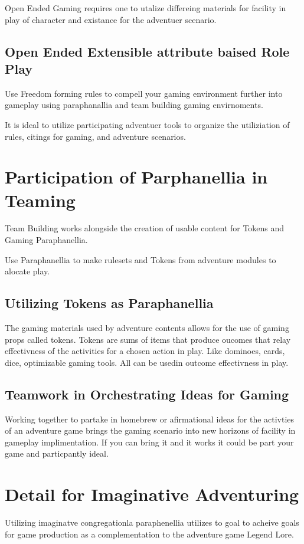 \documentclass{article}
\begin{document}
Open Ended Gaming requires one to utalize differeing materials for facility in play of character and existance for the adventuer scenario.

\subsection{Open Ended Extensible attribute baised Role Play}

Use Freedom forming rules to compell your gaming environment further into gameplay using paraphanallia and team building gaming envirnoments.

It is ideal to utilize participating adventuer tools to organize the utiliziation of rules, citings for gaming, and adventure scenarios.

\section{Participation of Parphanellia in Teaming}

Team Building works alongside the creation of usable content for Tokens and Gaming Paraphanellia.

Use Paraphanellia to make rulesets and Tokens from adventure modules to alocate play.

\subsection{Utilizing Tokens as Paraphanellia}

The gaming materials used by adventure contents allows for the use of gaming props called tokens. Tokens are sums of items that produce oucomes that relay effectivness of the activities for a chosen action in play. Like dominoes, cards, dice, optimizable gaming tools. All can be usedin outcome effectivness in play.

\subsection{Teamwork in Orchestrating Ideas for Gaming}
Working together to partake in homebrew or afirmational ideas for the activties of an adventure game brings the gaming scenario into new horizons of facility in gameplay implimentation. If you can bring it and it works it could be part your game and particpantly ideal.

\section{Detail for Imaginative Adventuring}
Utilizing imaginatve congregationla paraphenellia utilizes to goal to acheive goals for game production as a complementation to the adventure game Legend Lore.
\end{document}
